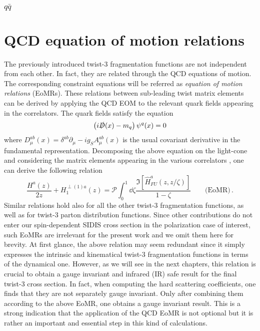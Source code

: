 \subsubsection*{$q \bar q$}
\section{QCD equation of motion relations}
The previously introduced twist-3 fragmentation functions are not independent from each other. In fact, they are related through the QCD equations of motion. The corresponding constraint equations will be referred as \textit{equation of motion relations} (EoMRs). These relations between sub-leading twist matrix elements can be derived by applying the QCD EOM to the relevant quark fields appearing in the correlators. The quark fields satisfy the equation
\begin{equation}
    \left(i \slashed{D}(x) -m_q \right)\psi^q(x)=0
\end{equation}
where $D_\mu^{ab}(x)=\delta^{ab}\partial_\mu -ig_S A_\mu^{ab}(x)$ is the usual covariant derivative in the fundamental representation. Decomposing the above equation on the light-cone and considering the matrix elements appearing in the various correlators \cite{bacchetta_semi-inclusive_2007}, one can derive the following relation \cite{kanazawa_operator_2016}
\begin{equation}
    \frac{H^a(z)}{2 z}+H_1^{\perp(1)a}(z)= \mathcal{P}\int_0^1\dd \zeta\frac{\Im[\hat H^a_{FU}(z,z/\zeta)]}{1-\zeta}\qquad \text{(EoMR)}\,.
\end{equation}
Similar relations hold also for all the other twist-3 fragmentation functions, as well as for twist-3 parton distribution functions. Since other contributions do not enter our spin-dependent SIDIS cross section in the polarization case of interest, such EoMRs are irrelevant for the present work and we omit them here for brevity. At first glance, the above relation may seem redundant since it simply expresses the intrinsic and kinematical twist-3 fragmentation functions in terms of the dynamical one. However, as we will see in the next chapters, this relation is crucial to obtain a gauge invariant and infrared (IR) safe result for the final twist-3 cross section. In fact, when computing the hard scattering coefficients, one finds that they are not separately gauge invariant. Only after combining them according to the above EoMR, one obtains a gauge invariant result. This is a strong indication that the application of the QCD EoMR is not optional but it is rather an important and essential step in this kind of calculations.

